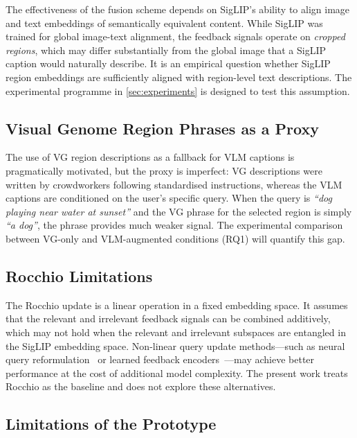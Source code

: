 \documentclass[12pt,a4paper]{article}
\begin{document}
The effectiveness of the fusion scheme depends on SigLIP's ability to align
image and text embeddings of semantically equivalent content. While SigLIP was
trained for global image-text alignment, the feedback signals operate on
\emph{cropped regions}, which may differ substantially from the global image
that a SigLIP caption would naturally describe. It is an empirical question
whether SigLIP region embeddings are sufficiently aligned with region-level
text descriptions. The experimental programme in \cref{sec:experiments}
is designed to test this assumption.

\subsection{Visual Genome Region Phrases as a Proxy}

The use of VG region descriptions as a fallback for VLM captions is
pragmatically motivated, but the proxy is imperfect: VG descriptions were
written by crowdworkers following standardised instructions, whereas the VLM
captions are conditioned on the user's specific query. When the query is
\emph{``dog playing near water at sunset''} and the VG phrase for the selected
region is simply \emph{``a dog''}, the phrase provides much weaker signal.
The experimental comparison between VG-only and VLM-augmented conditions (RQ1)
will quantify this gap.

\subsection{Rocchio Limitations}

The Rocchio update is a linear operation in a fixed embedding space. It assumes
that the relevant and irrelevant feedback signals can be combined additively,
which may not hold when the relevant and irrelevant subspaces are entangled in
the SigLIP embedding space. Non-linear query update methods—such as neural
query reformulation~\citep{Jiang2015} or learned feedback
encoders~\citep{Yu2021}—may achieve better performance at the cost of
additional model complexity. The present work treats Rocchio as the baseline
and does not explore these alternatives.

\subsection{Limitations of the Prototype}
\end{document}
